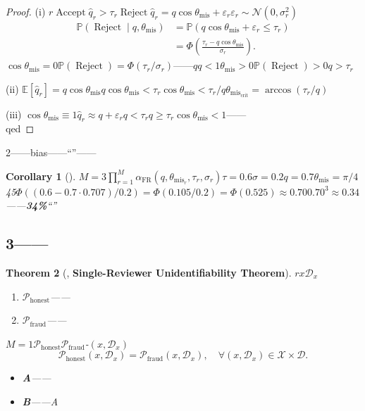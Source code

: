\documentclass[12pt,a4paper]{article}
\newtheorem{theorem}{Theorem}[section]
\newtheorem{corollary}[theorem]{Corollary}
\theoremstyle{remark}
\newcommand{\E}{\mathbb{E}}
\newcommand{\Pbb}{\mathbb{P}}
\newcommand{\misalignAngle}{\theta_{\text{mis}}}
\newcommand{\falseRejRate}{\alpha_{\text{FR}}}
\DeclareMathOperator{\Accept}{Accept}
\DeclareMathOperator{\Reject}{Reject}
\begin{document}
\begin{proof}
(i) $r$$\Accept$$\hat{q}_r > \tau_r$$\Reject$$\hat{q}_r = q \cos\misalignAngle + \varepsilon_r$$\varepsilon_r \sim \mathcal{N}(0, \sigma_r^2)$
\begin{align}
    \Pbb(\Reject \mid q, \misalignAngle) &= \Pbb(q \cos\misalignAngle + \varepsilon_r \leq \tau_r) \\
    &= \Phi\left(\frac{\tau_r - q \cos\misalignAngle}{\sigma_r}\right).
\end{align}
$\cos\misalignAngle = 0$$\Pbb(\Reject) = \Phi(\tau_r/\sigma_r)$——$q$$q < 1$$\misalignAngle > 0$$\Pbb(\Reject) > 0$$q > \tau_r$

(ii) $\E[\hat{q}_r] = q \cos\misalignAngle$$q \cos\misalignAngle < \tau_r$$\cos\misalignAngle < \tau_r/q$$\misalignAngle_{\text{crit}} = \arccos(\tau_r/q)$

(iii) $\cos\misalignAngle \equiv 1$$\hat{q}_r \approx q + \varepsilon_r$$q < \tau_r$$q \geq \tau_r$$\cos\misalignAngle < 1$——\\qed
\end{proof}

\begin{honestcrit}{2\textit{}——bias——``''——}
\end{honestcrit}

\begin{corollary}[]
\label{cor:rejection_tax_estimate}
$M=3$$\prod_{r=1}^{M} \falseRejRate(q, \misalignAngle_r, \tau_r, \sigma_r)$$\tau=0.6$$\sigma=0.2$$q=0.7$$\misalignAngle = \pi/4$45$\Phi((0.6 - 0.7 \cdot 0.707)/0.2) = \Phi(0.105/0.2) = \Phi(0.525) \approx 0.70$$0.70^3 \approx 0.34$——\textbf{34\%}``''
\end{corollary}

\subsection{3——}

\begin{theorem}[, \textbf{Single-Reviewer Unidentifiability Theorem}]
\label{thm:single_unidentifiability}
$r$$x$$\mathcal{D}_x$
\begin{enumerate}[label=(\roman*)]
    \item $\mathcal{P}_{\text{honest}}$——
    \item $\mathcal{P}_{\text{fraud}}$——
\end{enumerate}
$M=1$$\mathcal{P}_{\text{honest}}$$\mathcal{P}_{\text{fraud}}$\textbf{}-$(x, \mathcal{D}_x)$
\begin{equation}
    \mathcal{P}_{\text{honest}}(x, \mathcal{D}_x) = \mathcal{P}_{\text{fraud}}(x, \mathcal{D}_x), \quad \forall (x, \mathcal{D}_x) \in \mathcal{X} \times \mathcal{D}.
    \label{eq:observational_equivalence}
\end{equation}


\textbf{}
\begin{itemize}
    \item \textbf{A}——
    \item \textbf{B}——A
\end{itemize}
\end{theorem}
\end{document}

